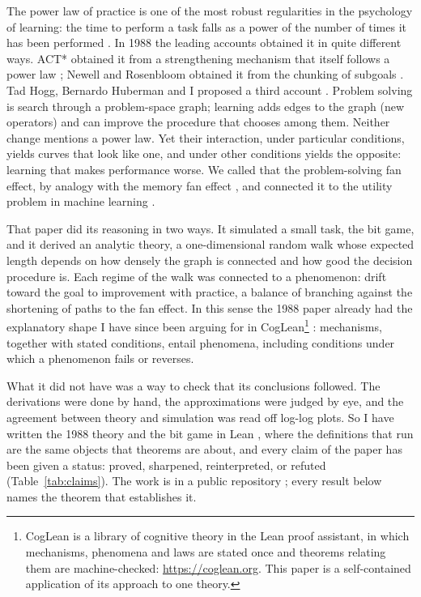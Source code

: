 \documentclass[11pt]{article}
\begin{document}
The power law of practice is one of the most robust regularities in the
psychology of learning: the time to perform a task falls as a power of the
number of times it has been performed \citep{snoddy1926,crossman1959,newell1981}.
In 1988 the leading accounts obtained it in quite different ways. ACT*
obtained it from a strengthening mechanism that itself follows a power law
\citep{anderson1983}; Newell and Rosenbloom obtained it from the chunking
of subgoals \citep{newell1981,rosenbloom1986}. Tad Hogg, Bernardo Huberman
and I proposed a third account \citep{shh1988}. Problem solving is search
through a problem-space graph; learning adds edges to the graph (new
operators) and can improve the procedure that chooses among them. Neither
change mentions a power law. Yet their interaction, under particular
conditions, yields curves that look like one, and under other conditions
yields the opposite: learning that makes performance worse. We called that
the problem-solving fan effect, by analogy with the memory fan effect
\citep{anderson1974}, and connected it to the utility problem in machine
learning \citep{minton1985,markovitch1988}.

That paper did its reasoning in two ways. It simulated a small task, the
bit game, and it derived an analytic theory, a one-dimensional random walk
whose expected length depends on how densely the graph is connected and how
good the decision procedure is. Each regime of the walk was connected to a
phenomenon: drift toward the goal to improvement with practice, a balance
of branching against the shortening of paths to the fan effect. In this
sense the 1988 paper already had the explanatory shape I have since been
arguing for in CogLean\footnote{CogLean is a library of cognitive theory in the Lean proof assistant, in which mechanisms, phenomena and laws are stated once and theorems relating them are machine-checked: \url{https://coglean.org}. This paper is a self-contained application of its approach to one theory.} \citep{coglean,cogleanintro}: mechanisms, together
with stated conditions, entail phenomena, including conditions under which
a phenomenon fails or reverses.

What it did not have was a way to check that its conclusions followed. The
derivations were done by hand, the approximations were judged by eye, and
the agreement between theory and simulation was read off log-log plots. So
I have written the 1988 theory and the bit game in Lean
\citep{demoura2021,mathlib2020}, where the definitions that run are the
same objects that theorems are about, and every claim of the paper has been
given a status: proved, sharpened, reinterpreted, or refuted
(Table~\ref{tab:claims}). The work is in a public repository
\citep{shh88revisited}; every result below names the theorem that
establishes it.
\end{document}
